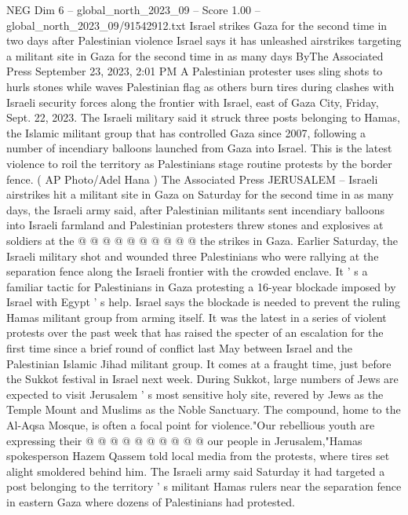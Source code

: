 \begin{textsample}{NEG Dim 6 – global\_north\_2023\_09 – Score 1.00 – global\_north\_2023\_09/91542912.txt}  \label{ex:f6_neg_343}
Israel strikes Gaza for the second time in two days after Palestinian violence Israel says it has unleashed airstrikes targeting a militant site in Gaza for the second time in as many days ByThe Associated Press September 23, 2023, 2:01 PM A Palestinian protester uses sling shots to hurls stones while waves Palestinian flag as others burn tires during clashes with Israeli security forces along the frontier with Israel, east of Gaza City, Friday, Sept. 22, 2023.
The Israeli military said it struck three posts belonging to Hamas, the Islamic militant group that has controlled Gaza since 2007, following a number of incendiary balloons launched from Gaza into Israel.
This is the latest violence to roil the territory as Palestinians stage routine protests by the border fence. ( AP Photo/Adel Hana ) The Associated Press JERUSALEM -- Israeli airstrikes hit a militant site in Gaza on Saturday for the second time in as many days, the Israeli army said, after Palestinian militants sent incendiary balloons into Israeli farmland and Palestinian protesters threw stones and explosives at soldiers at the @ @ @ @ @ @ @ @ @ @ the strikes in Gaza.
Earlier Saturday, the Israeli military shot and wounded three Palestinians who were rallying at the separation fence along the Israeli frontier with the crowded enclave.
It ' s a familiar tactic for Palestinians in Gaza protesting a 16-year blockade imposed by Israel with Egypt ' s help.
Israel says the blockade is needed to prevent the ruling Hamas militant group from arming itself.
It was the latest in a series of violent protests over the past week that has raised the specter of an escalation for the first time since a brief round of conflict last May between Israel and the Palestinian Islamic Jihad militant group.
It comes at a fraught time, just before the Sukkot festival in Israel next week.
During Sukkot, large numbers of Jews are expected to visit Jerusalem ' s most sensitive holy site, revered by Jews as the Temple Mount and Muslims as the Noble Sanctuary.
The compound, home to the Al-Aqsa Mosque, is often a focal point for violence."Our rebellious youth are expressing their @ @ @ @ @ @ @ @ @ @ our people in Jerusalem,"Hamas spokesperson Hazem Qassem told local media from the protests, where tires set alight smoldered behind him.
The Israeli army said Saturday it had targeted a post belonging to the territory ' s militant Hamas rulers near the separation fence in eastern Gaza where dozens of Palestinians had protested.

\end{textsample}
